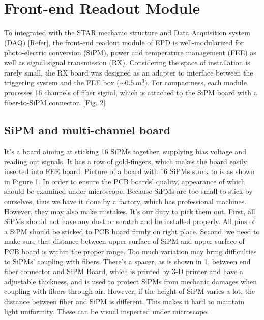 \documentclass[11pt,a4paper]{article}
\begin{document}
\section{Front-end Readout Module}
To integrated with the STAR mechanic structure and Data Acquisition system (DAQ) [Refer], the front-end readout module of EPD is well-modularized for photo-electric conversion (SiPM), power and temperature management (FEE) as well as signal signal transmission (RX).
Considering the space of installation is rarely small, the RX board was designed as an adapter to interface between the triggering system and the FEE box ($\sim 0.5~m^3$).
For compactness, each module processes 16 channels of fiber signal, which is  attached to the SiPM board with a fiber-to-SiPM connector. [Fig. 2]
\subsection{SiPM and multi-channel board}
It's a board aiming at sticking 16 SiPMs together, supplying bias voltage and reading out signals. It has a row of gold-fingers, which makes the board easily inserted into FEE board. Picture of a board with 16 SiPMs stuck to is as shown in Figure 1.
In order to ensure the PCB boards' quality, appearance of which should be
examined under microscope. Because SiPMs are too small to stick by ourselves, thus we have it done by a factory, which has professional machines. However, they may also make mistakes. It's our duty to pick them out. First, all SiPMs should not have any dust or scratch and be installed properly. All pins of a SiPM should be sticked to PCB board firmly on right place. Second, we need to make sure that distance between upper surface of SiPM and upper surface of PCB board is within the proper range. Too much variation may bring difficulties to SiPMs' coupling with fibers. There's a spacer, as is shown in 1, between end fiber connector and SiPM Board, which is printed by 3-D printer and have a adjustable thickness, and is used to protect SiPMs from mechanic damages when coupling with fibers through air. However, if the height of SiPM varies a lot, the distance between fiber and SiPM is different. This makes it hard to maintain light uniformity. These can be visual inspected under microscope.
\end{document}
